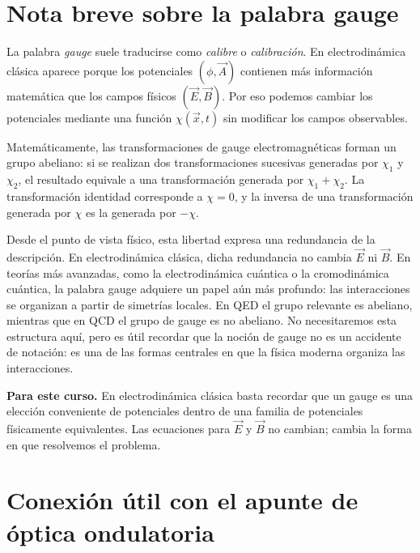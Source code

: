 \documentclass[12pt,a4paper]{article}
\theoremstyle{definition}
\theoremstyle{plain}
\numberwithin{equation}{section}
\theoremstyle{remark}
\newcommand{\E}{\vec{E}}
\newcommand{\B}{\vec{B}}
\begin{document}


\appendix


\section{Nota breve sobre la palabra gauge}
\label{ap:gauge-teorias}

La palabra \emph{gauge} suele traducirse como \emph{calibre} o \emph{calibración}. En electrodinámica clásica aparece porque los potenciales $(\phi,\vec A)$ contienen más información matemática que los campos físicos $(\E,\B)$. Por eso podemos cambiar los potenciales mediante una función $\chi(\vec x,t)$ sin modificar los campos observables.

Matemáticamente, las transformaciones de gauge electromagnéticas forman un grupo abeliano: si se realizan dos transformaciones sucesivas generadas por $\chi_1$ y $\chi_2$, el resultado equivale a una transformación generada por $\chi_1+\chi_2$. La transformación identidad corresponde a $\chi=0$, y la inversa de una transformación generada por $\chi$ es la generada por $-\chi$.

Desde el punto de vista físico, esta libertad expresa una redundancia de la descripción. En electrodinámica clásica, dicha redundancia no cambia $\E$ ni $\B$. En teorías más avanzadas, como la electrodinámica cuántica o la cromodinámica cuántica, la palabra gauge adquiere un papel aún más profundo: las interacciones se organizan a partir de simetrías locales. En QED el grupo relevante es abeliano, mientras que en QCD el grupo de gauge es no abeliano. No necesitaremos esta estructura aquí, pero es útil recordar que la noción de gauge no es un accidente de notación: es una de las formas centrales en que la física moderna organiza las interacciones.

\begin{cajaidea}
\textbf{Para este curso.} En electrodinámica clásica basta recordar que un gauge es una elección conveniente de potenciales dentro de una familia de potenciales físicamente equivalentes. Las ecuaciones para $\E$ y $\B$ no cambian; cambia la forma en que resolvemos el problema.
\end{cajaidea}

\section{Conexión útil con el apunte de óptica ondulatoria}
\label{ap:optica-ondulatoria}
\end{document}
